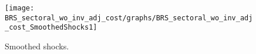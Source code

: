  
\begin{figure}[H]
\centering 
\texttt{[image: BRS\_sectoral\_wo\_inv\_adj\_cost/graphs/BRS\_sectoral\_wo\_inv\_adj\_cost\_SmoothedShocks1]}
\caption{Smoothed shocks.}\label{Fig:SmoothedShocks:1}
\end{figure}


